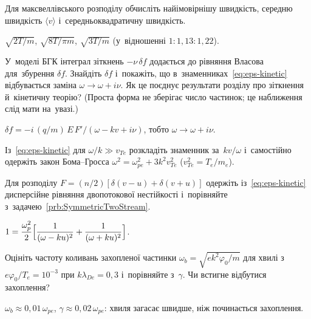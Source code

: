 \begin{problem}\label{prb:MaxwellSpeeds}
Для максвеллівського розподілу обчисліть найімовірнішу швидкість, середню швидкість $\langle v\rangle$
і~середньоквадратичну швидкість.
	\begin{solution}
		$\sqrt{2T/m}$, $\sqrt{8T/\pi m}$, $\sqrt{3T/m}$
(у~відношенні $1:1{,}13:1{,}22$).
	\end{solution}
\end{problem}

\begin{problem}\label{prb:BGKModel}
У~моделі БГК інтеграл зіткнень $-\nu\,\delta f$ додається до рівняння Власова для~збурення $\delta f$.
Знайдіть $\delta f$ і~покажіть, що в~знаменниках~\eqref{eq:eps-kinetic} відбувається заміна
$\omega\to\omega+i\nu$. Як це поєднує результати розділу про зіткнення й~кінетичну теорію?
(Проста форма не зберігає число частинок; це наближення слід мати на~увазі.)
	\begin{solution}
		$\delta f=-i\,(q/m)\,E\,F'/(\omega-kv+i\nu)$, тобто $\omega\to\omega+i\nu$.
	\end{solution}
\end{problem}

\begin{problem}\label{prb:BohmGrossDerivation}
Із~\eqref{eq:eps-kinetic} для $\omega/k\gg v_{Te}$ розкладіть знаменник за~$kv/\omega$ і~самостійно
одержіть закон Бома--Гросса $\omega^2=\omega_{pe}^2+3k^2v_{Te}^2$ ($v_{Te}^2=T_e/m_e$).
\end{problem}

\begin{problem}\label{prb:TwoStreamKinetic}
Для розподілу $F=(n/2)[\delta(v-u)+\delta(v+u)]$ одержіть із~\eqref{eq:eps-kinetic} дисперсійне
рівняння двопотокової нестійкості і~порівняйте з~задачею~\ref{prb:SymmetricTwoStream}.
	\begin{solution}
		$1=\dfrac{\omega_p^2}2\Bigl[\dfrac1{(\omega-ku)^2}+\dfrac1{(\omega+ku)^2}\Bigr]$.
	\end{solution}
\end{problem}

\begin{problem}\label{prb:TrappingCheck}
Оцініть частоту коливань захопленої частинки $\omega_b=\sqrt{ek^2\varphi_0/m}$ для хвилі з~$e\varphi_0/T_e=10^{-3}$
при $k\lambda_{De}=0{,}3$ і~порівняйте з~$\gamma$. Чи встигне відбутися захоплення?
	\begin{solution}
		$\omega_b\approx0{,}01\,\omega_{pe}$, $\gamma\approx0{,}02\,\omega_{pe}$: хвиля загасає швидше, ніж
починається захоплення.
	\end{solution}
\end{problem}


